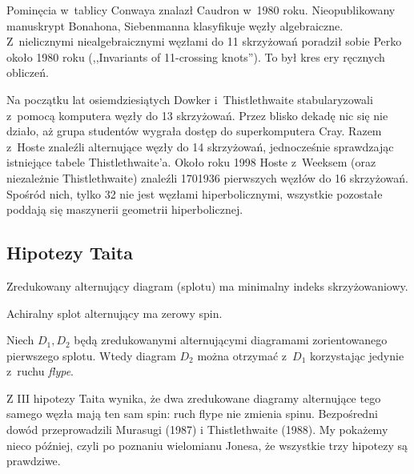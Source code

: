 {Pominęcia w~tablicy Conwaya znalazł Caudron w~1980 roku.
Nieopublikowany manuskrypt Bonahona, Siebenmanna klasyfikuje węzły algebraiczne.
Z~nielicznymi niealgebraicznymi węzłami do 11 skrzyżowań poradził sobie Perko około 1980 roku (,,Invariants of 11-crossing knots'').
To był kres ery ręcznych obliczeń.

Na początku lat osiemdziesiątych Dowker i~Thistlethwaite stabularyzowali z~pomocą komputera węzły do 13 skrzyżowań.
Przez blisko dekadę nic się nie działo, aż grupa studentów wygrała dostęp do superkomputera Cray.
Razem z~Hoste znaleźli alternujące węzły do 14 skrzyżowań, jednocześnie sprawdzając istniejące tabele Thistlethwaite'a.
Około roku 1998 Hoste z~Weeksem (oraz niezależnie Thistlethwaite) znaleźli 1701936 pierwszych węzłów do 16 skrzyżowań.
Spośród nich, tylko 32 nie jest węzłami hiperbolicznymi, wszystkie pozostałe poddają się maszynerii geometrii hiperbolicznej.

\subsection{Hipotezy Taita}
\begin{conjecture}
    \label{conj_tait_i}
    Zredukowany alternujący diagram (splotu) ma minimalny indeks skrzyżowaniowy.
\end{conjecture}

\begin{conjecture}
    \label{conj_tait_ii}
    Achiralny splot alternujący ma zerowy spin.
\end{conjecture}

\begin{conjecture}
    \label{conj_tait_iii}
    Niech $D_1, D_2$ będą zredukowanymi alternującymi diagramami zorientowanego pierwszego splotu.
    Wtedy diagram $D_2$ można otrzymać z~$D_1$ korzystając jedynie z~ruchu \emph{flype}.
\end{conjecture}

Z III hipotezy Taita wynika, że dwa zredukowane diagramy alternujące tego samego węzła mają ten sam spin: ruch flype nie zmienia spinu.
Bezpośredni dowód przeprowadzili Murasugi (1987) i Thistlethwaite (1988).
My pokażemy nieco później, czyli po poznaniu wielomianu Jonesa, że wszystkie trzy hipotezy są prawdziwe.

}
